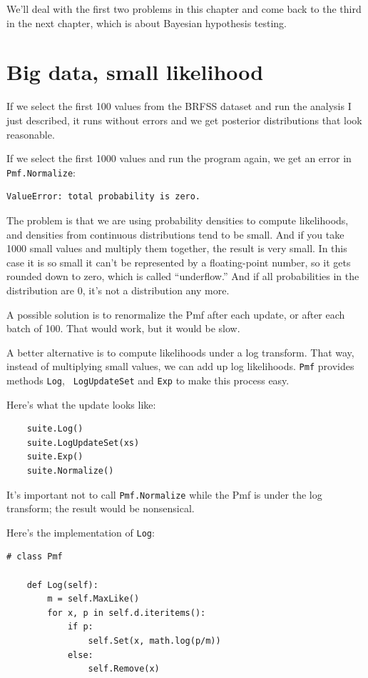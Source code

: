 \documentclass[12pt]{book}
\begin{document}
We'll deal with the first two problems in this chapter and come
back to the third in the next chapter, which is about
Bayesian hypothesis testing.


\section{Big data, small likelihood}

If we select the first 100 values from the BRFSS dataset and run the
analysis I just described, it runs without errors and we get posterior
distributions that look reasonable.

If we select the first 1000 values and run the program again, we get
an error in \verb"Pmf.Normalize":

\begin{verbatim}
ValueError: total probability is zero.
\end{verbatim}

The problem is that we are using probability densities to compute
likelihoods, and densities from continuous distributions tend to be
small.  And if you take 1000 small values and multiply
them together, the result is very small.  In this case it is so small
it can't be represented by a floating-point number, so it gets rounded
down to zero, which is called ``underflow.''  And if all
probabilities in the distribution are 0, it's not a distribution any
more.

A possible solution is to renormalize the Pmf after each update,
or after each batch of 100.  That would work, but it would be slow.

A better alternative is to compute likelihoods under a log
transform.  That way, instead of multiplying small values, we can add
up log likelihoods.  {\tt Pmf} provides methods {\tt Log}, {\tt
  LogUpdateSet} and {\tt Exp} to make this process easy.

Here's what the update looks like:

\begin{verbatim}
    suite.Log()
    suite.LogUpdateSet(xs)
    suite.Exp()
    suite.Normalize()
\end{verbatim}

It's important not to call \verb"Pmf.Normalize" while the Pmf
is under the log transform; the result would be nonsensical.

Here's the implementation of {\tt Log}:

\begin{verbatim}
# class Pmf

    def Log(self):
        m = self.MaxLike()
        for x, p in self.d.iteritems():
            if p:
                self.Set(x, math.log(p/m))
            else:
                self.Remove(x)
\end{verbatim}
\end{document}
